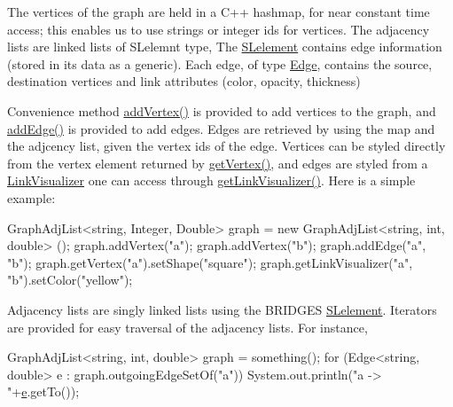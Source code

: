 The vertices of the graph are held in a C++ hashmap, for near constant time access; this enables us to use strings or integer ids for vertices. The adjacency lists are linked lists of S\+Lelemnt type, The \hyperlink{classbridges_1_1datastructure_1_1_s_lelement}{S\+Lelement} contains edge information (stored in its data as a generic). Each edge, of type \hyperlink{classbridges_1_1datastructure_1_1_edge}{Edge}, contains the source, destination vertices and link attributes (color, opacity, thickness)

Convenience method \hyperlink{classbridges_1_1datastructure_1_1_graph_adj_list_a3bde76e49be4330da895103475f8430b}{add\+Vertex()} is provided to add vertices to the graph, and \hyperlink{classbridges_1_1datastructure_1_1_graph_adj_list_a6573cc104657315196404bcef481d890}{add\+Edge()} is provided to add edges. Edges are retrieved by using the map and the adjcency list, given the vertex ids of the edge. Vertices can be styled directly from the vertex element returned by \hyperlink{classbridges_1_1datastructure_1_1_graph_adj_list_ada58af550495cee2fe454c0be0f8504e}{get\+Vertex()}, and edges are styled from a \hyperlink{classbridges_1_1datastructure_1_1_link_visualizer}{Link\+Visualizer} one can access through \hyperlink{classbridges_1_1datastructure_1_1_graph_adj_list_ae36ba10fae403339df0c36707ed13536}{get\+Link\+Visualizer()}. Here is a simple example\+: 
\begin{DoxyCode}
GraphAdjList<string, Integer, Double> graph = \textcolor{keyword}{new} GraphAdjList<string, int, double> ();
  graph.addVertex(\textcolor{stringliteral}{"a"});
  graph.addVertex(\textcolor{stringliteral}{"b"});
  graph.addEdge(\textcolor{stringliteral}{"a"}, \textcolor{stringliteral}{"b"});
  graph.getVertex(\textcolor{stringliteral}{"a"}).setShape(\textcolor{stringliteral}{"square"});
  graph.getLinkVisualizer(\textcolor{stringliteral}{"a"}, \textcolor{stringliteral}{"b"}).setColor(\textcolor{stringliteral}{"yellow"});
\end{DoxyCode}


Adjacency lists are singly linked lists using the B\+R\+I\+D\+G\+ES \hyperlink{classbridges_1_1datastructure_1_1_s_lelement}{S\+Lelement}. Iterators are provided for easy traversal of the adjacency lists. For instance,


\begin{DoxyCode}
GraphAdjList<string, int, double> graph = something();
\textcolor{keywordflow}{for} (Edge<string, double> e : graph.outgoingEdgeSetOf(\textcolor{stringliteral}{"a"}))
  System.out.println(\textcolor{stringliteral}{"a -> "}+\hyperlink{namespacebridges_1_1game_ab9a19c7ab6e2ebac2f95180e21733487ae1671797c52e15f763380b45e841ec32}{e}.getTo());
\end{DoxyCode}


